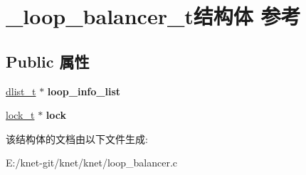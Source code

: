 \hypertarget{struct__loop__balancer__t}{}\section{\+\_\+loop\+\_\+balancer\+\_\+t结构体 参考}
\label{struct__loop__balancer__t}
\subsection*{Public 属性}
\begin{DoxyCompactItemize}
\item 
\hypertarget{struct__loop__balancer__t_a31f3e441c9d044bab51586436d64ec2c}{}\hyperlink{struct__dlist__t}{dlist\+\_\+t} $\ast$ {\bfseries loop\+\_\+info\+\_\+list}\label{struct__loop__balancer__t_a31f3e441c9d044bab51586436d64ec2c}

\item 
\hypertarget{struct__loop__balancer__t_ac373919d2691e1c10a452f3ef68d124c}{}\hyperlink{struct__lock__t}{lock\+\_\+t} $\ast$ {\bfseries lock}\label{struct__loop__balancer__t_ac373919d2691e1c10a452f3ef68d124c}

\end{DoxyCompactItemize}


该结构体的文档由以下文件生成\+:\begin{DoxyCompactItemize}
\item 
E\+:/knet-\/git/knet/knet/loop\+\_\+balancer.\+c\end{DoxyCompactItemize}
